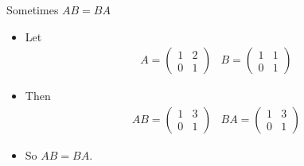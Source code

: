 \documentclass{beamer}
\begin{document}
\begin{frame}{Sometimes $AB = BA$}

\begin{itemize}
\item Let
$$
\begin{matrix}

A =

\begin{pmatrix}
1 & 2 \\
0 & 1
\end{pmatrix}

&

B =

\begin{pmatrix}
1 & 1 \\
0 & 1
\end{pmatrix}

\end{matrix}
$$

\item Then
$$
\begin{matrix}

AB =

\begin{pmatrix}
1 & 3 \\
0 & 1
\end{pmatrix}

&

BA =

\begin{pmatrix}
1 & 3 \\
0 & 1
\end{pmatrix}

\end{matrix}
$$
\item So $AB = BA$.

\end{itemize}

\end{frame}
\end{document}
